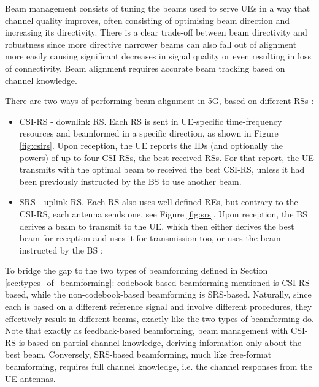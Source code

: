 Beam management consists of tuning the beams used to serve UEs in a way that channel quality improves, often consisting of optimising beam direction and increasing its directivity. There is a clear trade-off between beam directivity and robustness since more directive narrower beams can also fall out of alignment more easily causing significant decreases in signal quality or even resulting in loss of connectivity. Beam alignment requires accurate beam tracking based on channel knowledge.

There are two ways of performing beam alignment in \ac{5G}, based on different \acp{RS} \cite{beam_management}: 


\begin{itemize}
    \item \ac{CSI-RS} - downlink \ac{RS}. Each RS is sent in UE-specific time-frequency resources and beamformed in a specific direction, as shown in Figure \ref{fig:csirs}. Upon reception, the UE reports the IDs (and optionally the powers) of up to four CSI-RSs, the best received RSs. For that report, the UE transmits with the optimal beam to received the best CSI-RS, unless it had been previously instructed by the BS to use another beam. 
    \item \ac{SRS} - uplink \ac{RS}. Each RS also uses well-defined \acsp{RE}, but contrary to the \acs{CSI-RS}, each antenna sends one, see Figure \ref{fig:srs}. Upon reception, the BS derives a beam to transmit to the UE, which then either derives the best beam for reception and uses it for transmission too, or uses the beam instructed by the BS \cite{DAHLMAN2018};
\end{itemize}


To bridge the gap to the two types of beamforming defined in Section \ref{sec:types_of_beamforming}: codebook-based beamforming mentioned is CSI-RS-based, while the non-codebook-based beamforming is SRS-based. Naturally, since each is based on a different reference signal and involve different procedures, they effectively result in different beams, exactly like the two types of beamforming do. Note that exactly as feedback-based beamforming, beam management with CSI-RS is based on partial channel knowledge, deriving information only about the best beam. Conversely, SRS-based beamforming, much like free-format beamforming, requires full channel knowledge, i.e. the channel responses from the \ac{UE} antennas.

